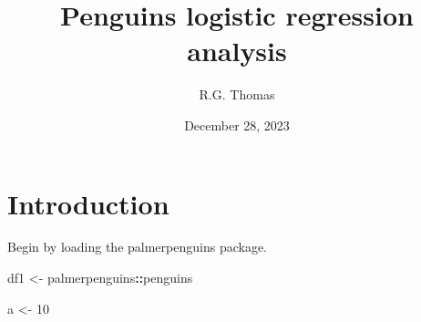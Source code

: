\documentclass[
  11pt,
]{article}
\title{Penguins logistic regression analysis}
\author{R.G. Thomas}
\date{December 28, 2023}
\newenvironment{Shaded}{\begin{snugshade}}{\end{snugshade}}
\newcommand{\DecValTok}[1]{\textcolor[rgb]{0.00,0.00,0.81}{#1}}
\newcommand{\NormalTok}[1]{#1}
\newcommand{\OtherTok}[1]{\textcolor[rgb]{0.56,0.35,0.01}{#1}}
\newcommand{\SpecialCharTok}[1]{\textcolor[rgb]{0.81,0.36,0.00}{\textbf{#1}}}
\begin{document}
\maketitle

{
\setcounter{tocdepth}{2}
\tableofcontents
}
\section{Introduction}\label{introduction}

Begin by loading the palmerpenguins package.

\begin{Shaded}
\begin{Highlighting}[]
\NormalTok{df1 }\OtherTok{\textless{}{-}}\NormalTok{ palmerpenguins}\SpecialCharTok{::}\NormalTok{penguins}

\NormalTok{a }\OtherTok{\textless{}{-}} \DecValTok{10}
\end{Highlighting}
\end{Shaded}

\lipsum[1-10]




\nocite{*}
\end{document}
